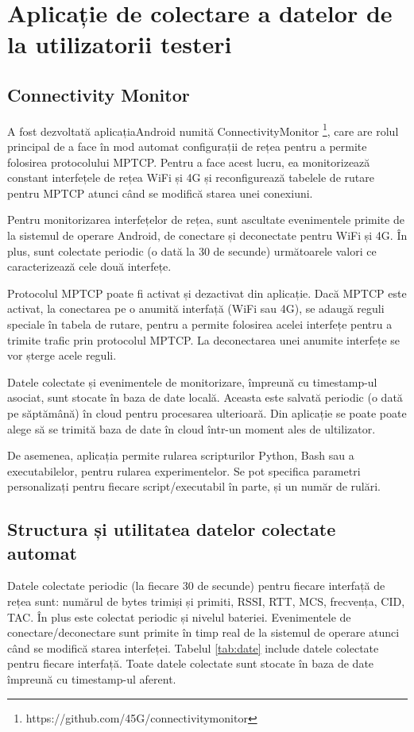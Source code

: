 \chapter{Aplicație de colectare a datelor de la utilizatorii testeri}

\section{Connectivity Monitor}

A fost dezvoltată aplicațiaAndroid numită ConnectivityMonitor \footnote{https://github.com/45G/connectivitymonitor}, care are rolul principal de a face în mod automat configurații de rețea pentru a permite folosirea protocolului MPTCP. Pentru a face acest lucru, ea monitorizează constant interfețele de rețea WiFi și 4G și reconfigurează tabelele de rutare pentru MPTCP atunci când se modifică starea unei conexiuni.

Pentru monitorizarea interfețelor de rețea, sunt ascultate evenimentele primite de la sistemul de operare Android, de conectare și deconectate pentru WiFi și 4G. În plus, sunt colectate periodic (o dată la 30 de secunde) următoarele valori ce caracterizează cele două interfețe.

Protocolul MPTCP poate fi activat și dezactivat din aplicație. Dacă MPTCP este activat, la conectarea pe o anumită interfață (WiFi sau 4G), se adaugă reguli speciale în tabela de rutare, pentru a permite folosirea acelei interfețe pentru a trimite trafic prin protocolul MPTCP. La deconectarea unei anumite interfețe se vor șterge acele reguli.

Datele colectate și evenimentele de monitorizare, împreună cu timestamp-ul asociat, sunt stocate în baza de date locală. Aceasta este salvată periodic (o dată pe săptămână) în cloud pentru procesarea ulterioară. Din aplicație se poate poate alege să se trimită baza de date în cloud într-un moment ales de ultilizator. 

De asemenea, aplicația permite rularea scripturilor Python, Bash sau a executabilelor, pentru rularea experimentelor. Se pot specifica parametri personalizați pentru fiecare script/executabil în parte, și un număr de rulări.

\section{Structura și utilitatea datelor colectate automat}

Datele colectate periodic (la fiecare 30 de secunde) pentru fiecare interfață de rețea sunt: numărul de bytes trimiși și primiti, RSSI, RTT, MCS, frecvența, CID, TAC.  În plus este colectat periodic și nivelul bateriei. Evenimentele de conectare/deconectare sunt primite în timp real de la sistemul de operare atunci când se modifică starea interfeței.  Tabelul \ref{tab:date} include datele colectate pentru fiecare interfață. Toate datele colectate sunt stocate în baza de date împreună cu timestamp-ul aferent.

